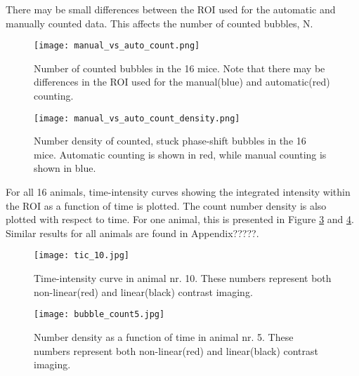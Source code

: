 There may be small differences between the ROI used for the automatic and manually counted data. This affects the number of counted bubbles, N.

\begin{figure}[h]
  \centering
  \texttt{[image: manual\_vs\_auto\_count.png]}
  \caption{Number of counted bubbles in the 16 mice. Note that there may be differences in the ROI used for the manual(blue) and automatic(red) counting.}
  \label{Fig:Number of counted bubbles}
\end{figure}

\begin{figure}[h]
  \centering
  \texttt{[image: manual\_vs\_auto\_count\_density.png]}
  \caption{Number density of counted, stuck phase-shift bubbles in the 16 mice. Automatic counting is shown in red, while manual counting is shown in blue.}
  \label{Fig:Number density of counted bubbles}
\end{figure}

For all 16 animals, time-intensity curves showing the integrated intensity within the ROI as a function of time is plotted. The count number density is also plotted with respect to time. For one animal, this is presented in Figure \ref{Fig:tic} and \ref{Fig:tic_count}. Similar results for all animals are found in Appendix?????.


\begin{figure}[h]
  \centering
  \texttt{[image: tic\_10.jpg]}
  \caption{Time-intensity curve in animal nr. 10. These numbers represent both non-linear(red) and linear(black) contrast imaging.}
  \label{Fig:tic}
\end{figure}

\begin{figure}[h]
  \centering
  \texttt{[image: bubble\_count5.jpg]}
  \caption{Number density as a function of time in animal nr. 5. These numbers represent both non-linear(red) and linear(black) contrast imaging.}
  \label{Fig:tic_count}
\end{figure}

\clearpage



